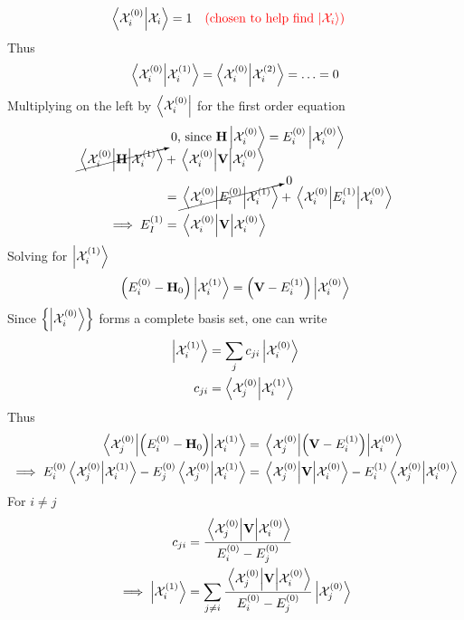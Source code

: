 \documentclass[12pt,a4paper,titlepage]{article}
\newcommand{\trm}[1]{\textrm{#1}} %
\newcommand{\Chi}{\mathcal{X}} %
\begin{document}
\begin{equation}
\ip{\Chi_{i}^{(0)}}{\Chi_{i}}=1\qq{\color{red}(chosen to help find $\ket{\Chi_{i}}$)}
\end{equation}
Thus
\begin{equation}
\ip{\Chi_{i}^{(0)}}{\Chi_{i}^{(1)}}=\ip{\Chi_{i}^{(0)}}{\Chi_{i}^{(2)}}=\ldots=0
\end{equation}
Multiplying on the left by $\bra{\Chi_{i}^{(0)}}$ for the first order equation
\begin{equation}
\begin{aligned}
\cancelto{\mathrlap{0\trm{, since }\vb{H}\ket{\Chi_{i}^{(0)}}=E_{i}^{(0)}\ket{\Chi_{i}^{(0)}}}}{\mel{\Chi_{i}^{(0)}}{\vb{H}}{\Chi_{i}^{(1)}}}&+\mel{\Chi_{i}^{(0)}}{\vb{V}}{\Chi_{i}^{(0)}}\\
&=\cancelto{0}{\mel{\Chi_{i}^{(0)}}{E_{i}^{(0)}}{\Chi_{i}^{(1)}}}+\mel{\Chi_{i}^{(0)}}{E_{i}^{(1)}}{\Chi_{i}^{(0)}}\\
\implies E_{I}^{(1)}&=\mel{\Chi_{i}^{(0)}}{\vb{V}}{\Chi_{i}^{(0)}}
\end{aligned}
\end{equation}
Solving for $\ket{\Chi_{i}^{(1)}}$
\begin{equation}
\qty(E_{i}^{(0)}-\vb{H}_{0})\ket{\Chi_{i}^{(1)}}=\qty(\vb{V}-E_{i}^{(1)})\ket{\Chi_{i}^{(0)}}
\end{equation}
Since $\qty{\ket{\Chi_{i}^{(0)}}}$ forms a complete basis set, one can write
\begin{equation}
\begin{aligned}
\ket{\Chi_{i}^{(1)}}&=\sum_{j}c_{ji}\ket{\Chi_{i}^{(0)}}\\
c_{ji}&=\ip{\Chi_{j}^{(0)}}{\Chi_{i}^{(1)}}
\end{aligned}
\end{equation}
Thus
\begin{equation}
\begin{aligned}
\mel{\Chi_{j}^{(0)}}{\qty(E_{i}^{(0)}-\vb{H}_{0})}{\Chi_{i}^{(1)}}&=\mel{\Chi_{j}^{(0)}}{\qty(\vb{V}-E_{i}^{(1)})}{\Chi_{i}^{(0)}}\\
\implies E_{i}^{(0)}\ip{\Chi_{j}^{(0)}}{\Chi_{i}^{(1)}}-E_{j}^{(0)}\ip{\Chi_{j}^{(0)}}{\Chi_{i}^{(1)}}&=\mel{\Chi_{j}^{(0)}}{\vb{V}}{\Chi_{i}^{(0)}}-E_{i}^{(1)}\ip{\Chi_{j}^{(0)}}{\Chi_{i}^{(0)}}
\end{aligned}
\end{equation}
For $i\neq j$
\begin{equation}
\begin{aligned}
c_{ji}&=\frac{\mel{\Chi_{j}^{(0)}}{\vb{V}}{\Chi_{i}^{(0)}}}{E_{i}^{(0)}-E_{j}^{(0)}}\\
\implies\ket{\Chi_{i}^{(1)}}&=\sum_{j\neq i}\frac{\mel{\Chi_{j}^{(0)}}{\vb{V}}{\Chi_{i}^{(0)}}}{E_{i}^{(0)}-E_{j}^{(0)}}\ket{\Chi_{j}^{(0)}}
\end{aligned}
\end{equation}
\end{document}
